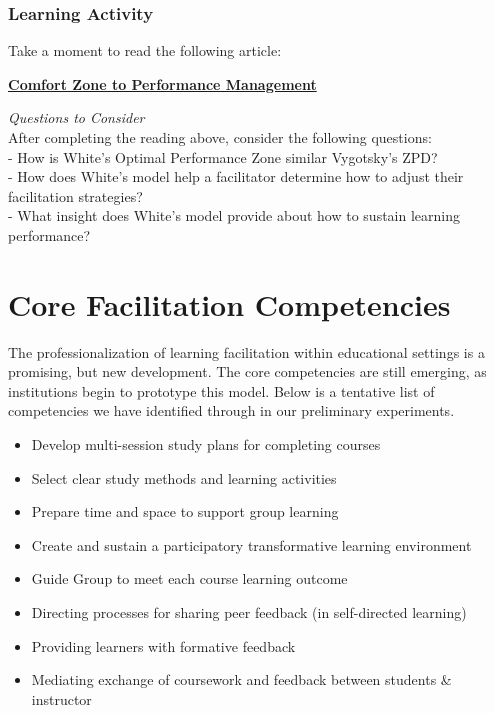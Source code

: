 \documentclass[
]{book}
\providecommand{\tightlist}{%
  \setlength{\itemsep}{0pt}\setlength{\parskip}{0pt}}
\begin{document}
\begin{reflect}
\hypertarget{learning-activity-6}{%
\subsubsection*{Learning Activity}\label{learning-activity-6}}

Take a moment to read the following article:

\href{https://www.researchgate.net/publication/228957278_From_Comfort_Zone_to_Performance_Management}{\textbf{Comfort Zone to Performance Management}}

\emph{Questions to Consider}\\
After completing the reading above, consider the following questions:\\
- How is White's Optimal Performance Zone similar Vygotsky's ZPD?\\
- How does White's model help a facilitator determine how to adjust their facilitation strategies?\\
- What insight does White's model provide about how to sustain learning performance?
\end{reflect}

\hypertarget{core-facilitation-competencies}{%
\section{Core Facilitation Competencies}\label{core-facilitation-competencies}}

The professionalization of learning facilitation within educational settings is a promising, but new development. The core competencies are still emerging, as institutions begin to prototype this model. Below is a tentative list of competencies we have identified through in our preliminary experiments.

\begin{itemize}
\tightlist
\item
  Develop multi-session study plans for completing courses
\item
  Select clear study methods and learning activities
\item
  Prepare time and space to support group learning
\item
  Create and sustain a participatory transformative learning environment
\item
  Guide Group to meet each course learning outcome
\item
  Directing processes for sharing peer feedback (in self-directed learning)
\item
  Providing learners with formative feedback
\item
  Mediating exchange of coursework and feedback between students \& instructor
\end{itemize}
\end{document}
